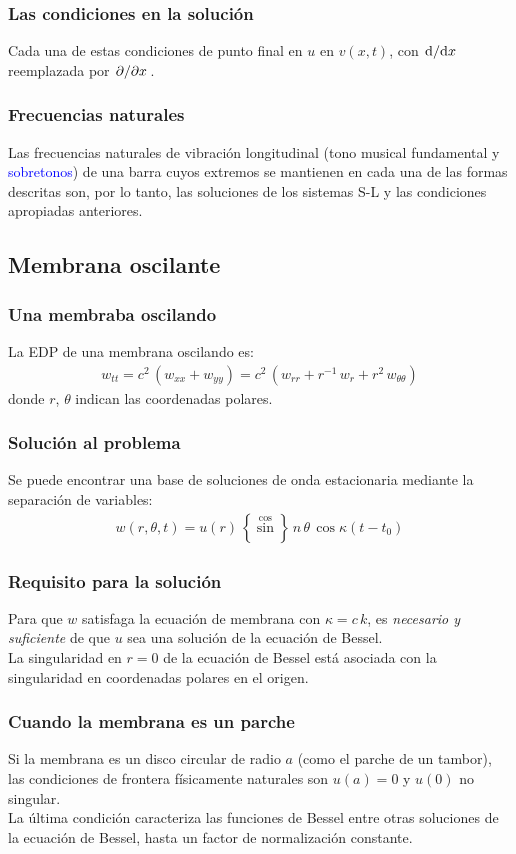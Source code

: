 \documentclass[12pt]{beamer}
\begin{document}
\begin{frame}
\frametitle{Las condiciones en la solución}
Cada una de estas condiciones de punto final en $u$  en $v (x, t)$, con $\dv*{x}$ reemplazada por $\pdv*{x}$.
\end{frame}
\begin{frame}
\frametitle{Frecuencias naturales}
Las frecuencias naturales de vibración longitudinal (\textcolor{lava}{tono musical fundamental} y \textcolor{blue}{sobretonos}) de una barra cuyos extremos se mantienen en cada una de las formas descritas son, \pause por lo tanto, las soluciones de los sistemas S-L y las condiciones apropiadas anteriores.
\end{frame}

\subsection{Membrana oscilante}

\begin{frame}
\frametitle{Una membraba oscilando}
La EDP de una membrana oscilando es:
\begin{align*}
w_{tt} = c^{2} \, (w_{xx} + w_{yy}) = c^{2} \, (w_{rr} + r^{-1} \, w_{r} + r^{2} \, w_{\theta \theta})
\end{align*}
donde $r$, $\theta$ indican las coordenadas polares.
\end{frame}
\begin{frame}
\frametitle{Solución al problema}
Se puede encontrar una base de soluciones de onda estacionaria mediante la separación de variables:
\begin{align*}
w (r, \theta, t) = u (r) \, \left\{ \stackrel{\displaystyle \cos}{\sin} \right\} \, n \, \theta \, \cos \kappa (t - t_{0})
\end{align*}
\end{frame}
\begin{frame}
\frametitle{Requisito para la solución}
Para que $w$ satisfaga la ecuación de membrana con $\kappa = c \, k$, \pause es \emph{necesario y suficiente} de que $u$ sea una solución de la ecuación de Bessel.
\\
\bigskip
\pause
La singularidad en $r = 0$ de la ecuación de Bessel está asociada con la singularidad en coordenadas polares en el origen.
\end{frame}
\begin{frame}
\frametitle{Cuando la membrana es un parche}
Si la membrana es un disco circular de radio $a$ (como el parche de un tambor), \pause las condiciones de frontera físicamente naturales son $u (a) = 0$ y $u(0)$ no singular.
\\
\bigskip
\pause
La última condición caracteriza las funciones de Bessel entre otras soluciones de la ecuación de Bessel, hasta un factor de normalización constante.
\end{frame}
\end{document}
